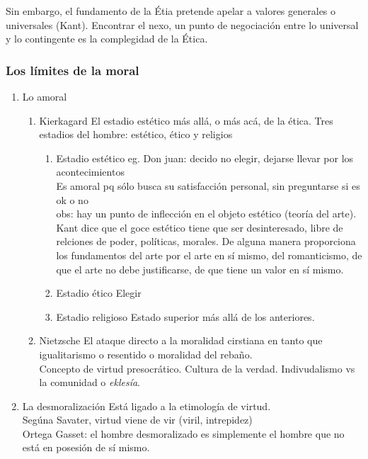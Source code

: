 \documentclass[11pt]{article}
\begin{document}
Sin embargo, el fundamento de la Étia pretende apelar a valores
generales o universales (Kant). Encontrar el nexo, un punto de
negociación entre lo universal y lo contingente es la complegidad de
la Ética.\\
\subsubsection{Los límites de la moral}
\label{sec:orgf0a8807}
\begin{enumerate}
\item Lo amoral
\label{sec:org36ad720}
\begin{enumerate}
\item Kierkagard
\label{sec:orgb064bd8}
El estadio estético más allá, o más acá, de la ética.
Tres estadios del hombre: estético, ético y religios
\begin{enumerate}
\item Estadio estético
\label{sec:orge113d37}
eg. Don juan: decido no elegir, dejarse llevar por los
acontecimientos\\
Es amoral pq sólo busca su satisfacción personal, sin preguntarse si
es ok o no\\
obs: hay un punto de inflección en el objeto estético (teoría del
arte). Kant dice que el goce estético tiene que ser desinteresado,
libre de relciones de poder, políticas, morales. De alguna manera
proporciona los fundamentos del arte por el arte en sí mismo, del
romanticismo, de que el arte no debe justificarse, de que tiene un
valor en sí mismo.
\item Estadio ético
\label{sec:org0b90c6a}
Elegir 
\item Estadio religioso
\label{sec:org1d1b3e0}
Estado superior más allá de los anteriores.
\end{enumerate}
\item Nietzsche
\label{sec:orgd246012}
El ataque directo a la moralidad cirstiana en tanto que igualitarismo
o resentido o moralidad del rebaño.\\
Concepto de virtud presocrático. Cultura de la verdad.
Indivudalismo vs la comunidad o \emph{eklesía}.
\end{enumerate}
\item La desmoralización
\label{sec:org295be72}
Está ligado a la etimología de virtud.\\
Segúna Savater, virtud viene de vir (viril, intrepidez)\\
Ortega Gasset: el hombre desmoralizado es simplemente el hombre que no
está en posesión de sí mismo.\\

\end{enumerate}
\end{document}
